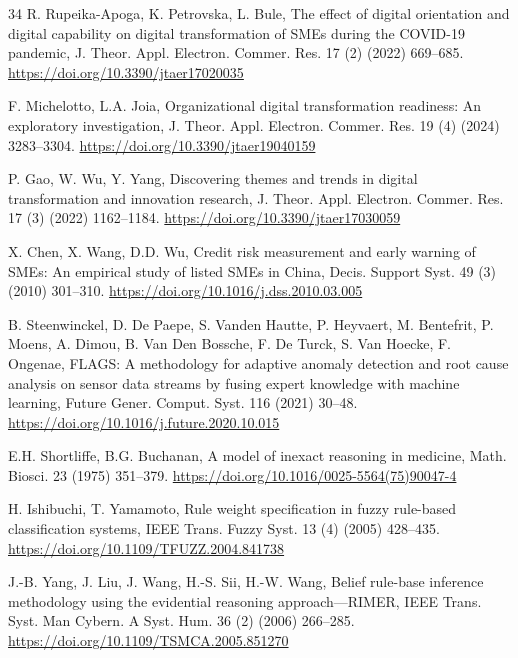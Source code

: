 \documentclass[preprint,12pt]{elsarticle}
\begin{document}
{\begin{thebibliography}{34}
R. Rupeika-Apoga, K. Petrovska, L. Bule, The effect of digital orientation and digital capability on digital transformation of SMEs during the COVID-19 pandemic, J. Theor. Appl. Electron. Commer. Res. 17 (2) (2022) 669--685. \newline\url{https://doi.org/10.3390/jtaer17020035}

F. Michelotto, L.A. Joia, Organizational digital transformation readiness: An exploratory investigation, J. Theor. Appl. Electron. Commer. Res. 19 (4) (2024) 3283--3304. \newline\url{https://doi.org/10.3390/jtaer19040159}

P. Gao, W. Wu, Y. Yang, Discovering themes and trends in digital transformation and innovation research, J. Theor. Appl. Electron. Commer. Res. 17 (3) (2022) 1162--1184. \newline\url{https://doi.org/10.3390/jtaer17030059}

X. Chen, X. Wang, D.D. Wu, Credit risk measurement and early warning of SMEs: An empirical study of listed SMEs in China, Decis. Support Syst. 49 (3) (2010) 301--310. \newline\url{https://doi.org/10.1016/j.dss.2010.03.005}

B. Steenwinckel, D. De Paepe, S. Vanden Hautte, P. Heyvaert, M. Bentefrit, P. Moens, A. Dimou, B. Van Den Bossche, F. De Turck, S. Van Hoecke, F. Ongenae, FLAGS: A methodology for adaptive anomaly detection and root cause analysis on sensor data streams by fusing expert knowledge with machine learning, Future Gener. Comput. Syst. 116 (2021) 30--48. \newline\url{https://doi.org/10.1016/j.future.2020.10.015}

E.H. Shortliffe, B.G. Buchanan, A model of inexact reasoning in medicine, Math. Biosci. 23 (1975) 351--379. \newline\url{https://doi.org/10.1016/0025-5564(75)90047-4}

H. Ishibuchi, T. Yamamoto, Rule weight specification in fuzzy rule-based classification systems, IEEE Trans. Fuzzy Syst. 13 (4) (2005) 428--435. \newline\url{https://doi.org/10.1109/TFUZZ.2004.841738}

J.-B. Yang, J. Liu, J. Wang, H.-S. Sii, H.-W. Wang, Belief rule-base inference methodology using the evidential reasoning approach---RIMER, IEEE Trans. Syst. Man Cybern. A Syst. Hum. 36 (2) (2006) 266--285. \newline\url{https://doi.org/10.1109/TSMCA.2005.851270}


\end{thebibliography}}
\end{document}
